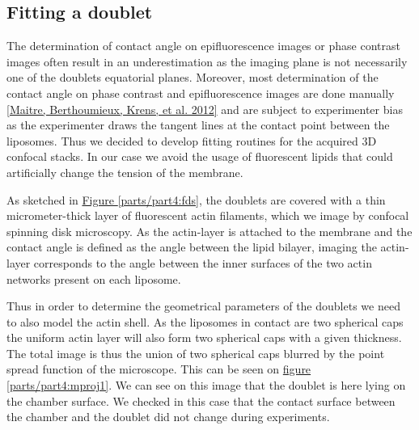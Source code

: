 \documentclass[A4paperpaper,11pt,english]{sphinxmanual}
\begin{document}
\subsection{Fitting a doublet}
\label{parts/part4:fitting-a-doublet}
The determination of contact angle on epifluorescence images or phase contrast
images often result in an underestimation as the imaging plane is not necessarily one of the doublets
equatorial planes. Moreover, most determination of the contact angle on phase
contrast and epifluorescence images are done manually {\hyperref[parts/part4:maitre2012]{{[}Maitre, Berthoumieux, Krens,  et al.  2012{]}}} and
are subject to experimenter bias as the experimenter draws the tangent lines at the
contact point between the liposomes. Thus we decided to develop fitting routines for the acquired
3D confocal stacks. In our case we avoid the usage of
fluorescent lipids that could artificially change the tension of the membrane.

As sketched in \hyperref[parts/part4:fds]{Figure  \ref*{parts/part4:fds}}, the doublets are covered with a
thin micrometer-thick layer of fluorescent actin filaments, which we
image by confocal spinning disk microscopy. As the actin-layer is attached to the membrane
and the contact angle is defined as the angle between the lipid bilayer, imaging the actin-layer corresponds
to the angle between the inner surfaces of the two actin networks present on each liposome.

Thus in order to determine the geometrical parameters of the doublets we need
to also model the actin shell. As the liposomes in contact are two spherical
caps the uniform actin layer will also form two spherical caps with a given
thickness. The total image is thus the union of two spherical caps blurred by
the point spread function of the microscope. This can be seen on \hyperref[parts/part4:mproj1]{figure  \ref*{parts/part4:mproj1}}.  We can see on this image that the doublet is here lying on the
chamber surface. We checked in this case that the contact surface between the
chamber and the doublet did not change during experiments.
\end{document}
